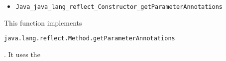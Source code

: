 \documentclass[a4paper, 10pt, titlepage]{scrartcl} %
\begin{document}
\begin{itemize}
 \item \begin{scriptsize}\verb|Java_java_lang_reflect_Constructor_getParameterAnnotations|\end{scriptsize}
\end{itemize}
This function implements
\begin{scriptsize}\verb|java|\hspace{0.0pt}\verb|.|\hspace{0.0pt}\verb|lang|\hspace{0.0pt}\verb|.|\hspace{0.0pt}\verb|reflect|\hspace{0.0pt}\verb|.|\hspace{0.0pt}\verb|Method|\hspace{0.0pt}\verb|.|\hspace{0.0pt}\verb|getParameterAnnotations|\end{scriptsize}. It uses the
\end{document}
